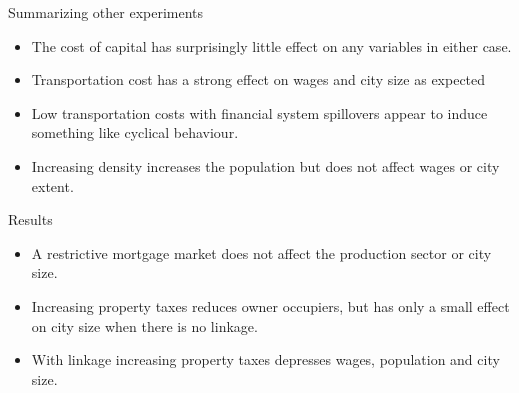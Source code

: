 \documentclass[notes=show]{beamer} %
\begin{document}


\begin{frame}{Summarizing other experiments}
\begin {itemize}[<alert@+>]\Large 


 \item  The cost of capital has surprisingly little effect on any variables in either case.

 \item  Transportation cost has a strong effect on wages and city size as expected 
 
  \item Low transportation costs with financial system spillovers appear to induce something like cyclical behaviour.

 \item  Increasing density increases the population but does not affect wages or city extent.
\end{itemize}
\end{frame}%


\begin{frame}{Results} \Large
\begin {itemize}[<+-|alert@+>]
 \item A restrictive mortgage market does not affect the production sector or city size.

 \item  Increasing property taxes reduces owner occupiers, but has only a small effect on city size when there is no linkage. 
 
 \item  With linkage increasing property taxes depresses wages, population and city size.
\end{itemize}
\end{frame}%
\end{document}
